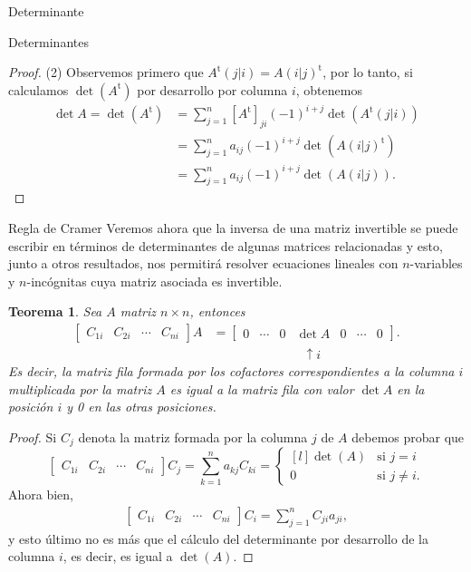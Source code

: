 \documentclass[a4paper,12pt,twoside,spanish,reqno]{amsbook}
\newtheorem{teorema}{Teorema}[section]
\theoremstyle{definition}
\theoremstyle{remark}
\renewcommand{\t}{{\operatorname{t}}}
\begin{document}
\begin{chapter}{Determinante}
\begin{section}{Determinantes}
\begin{proof}
		 	
		 	(2) Observemos primero que $A^\t(j|i) = A(i|j)^\t$, por lo tanto, si calculamos $\det(A^\t)$ por desarrollo por columna $i$, obtenemos 
		 	\begin{align*}
		 	\det A = \det(A^\t)&=\sum_{j=1}^{n} [A^\t]_{ji} (-1)^{i+j}\det (A^\t(j|i)) \\
		 	&=  \sum_{j=1}^{n} a_{ij} (-1)^{i+j}\det (A(i|j)^\t) \\
		 	&= \sum_{j=1}^{n} a_{ij} (-1)^{i+j}\det (A(i|j)).
		 	\end{align*}
		 	
		 	
		 \end{proof}
		 
		 
		\end{section}
	
		 
		 
		 \begin{section}{Regla de Cramer} Veremos ahora que la inversa de una matriz invertible se puede escribir en términos de determinantes de algunas matrices relacionadas y esto, junto a otros resultados, nos permitirá resolver ecuaciones lineales con $n$-variables y $n$-incógnitas cuya matriz asociada es invertible.  
		 	
		 	\begin{teorema} \label{th-cof-01}
		 		Sea $A$ matriz $n \times n$, entonces
		 		\begin{align*}
		 		\begin{bmatrix} C_{1i} & C_{2i} & \cdots & C_{ni}\end{bmatrix} A &= 
		 		\begin{bmatrix} 0 & \cdots& 0 & \det A & 0 &\cdots  & 0 \end{bmatrix}. \\
		 		&\hspace{3cm} \uparrow i
		 		\end{align*}
		 		Es decir, la matriz fila formada por los cofactores correspondientes a la columna  $i$ multiplicada por la matriz $A$ es igual a la matriz fila con valor $\det A$ en la posición $i$ y 0 en las otras posiciones.	 
		 	\end{teorema}
		 	\begin{proof}
		 		Si $C_j$ denota la matriz formada por la columna $j$ de $A$ debemos probar que
		 		$$
		 		\begin{bmatrix} C_{1i} & C_{2i} & \cdots & C_{ni}\end{bmatrix} C_j = \sum_{k=1}^{n} a_{kj}C_{ki} = \left\{ \begin{matrix*}[l] \det(A) &\text{si $j = i$}  \\ 0 &\text{si $j \ne i$.}\end{matrix*}\right.
		 		$$ 
		 		Ahora bien,
		 		\begin{align*}
		 		\begin{bmatrix} C_{1i} & C_{2i} & \cdots & C_{ni}\end{bmatrix} C_i = \sum_{j=1}^{n} C_{ji}a_{ji},
		 		\end{align*}
		 		y esto último no es más que el cálculo del determinante por desarrollo de la  columna $i$,  es decir,  es igual a $\det(A)$.
		 		

\end{proof}
\end{section}
\end{chapter}
\end{document}
